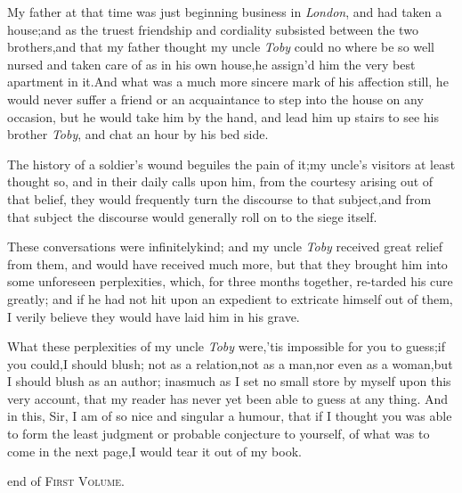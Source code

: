 \documentclass{article}
\begin{document}
My father at that time was just beginning business in
\textit{London}, and had taken a house;\tsk  and as the truest
friendship and cordiality subsisted between the two
brothers,\tsk  and that my father thought my uncle \textit{Toby} could no where be so well nursed
and taken care of as in his own house,\tsh  he
assign’d him the very best apartment in it.\tsk  And what
was a much more sincere mark of his affection still, he would never
suffer a friend or an acquaintance to step into the house on
any
occasion, but he would take him by the hand, and lead him up stairs
to see his brother \textit{Toby}, and chat an hour by his
bed side.

The history of a soldier’s wound beguiles the pain of
it;\tsk  my uncle’s visitors at least thought so, and in
their daily calls upon him, from the courtesy arising out of that
belief, they would frequently turn the discourse to that
subject,\tsk  and from that subject the discourse would generally
roll on to the siege itself.

These conversations were infinitely\break kind; and my uncle
\textit{Toby} received great relief from them, and would have
recei\-ved much more, but that they brought him into some unforeseen
perplexities, which, for three months together, re-\break tarded his
cure greatly; and if he had not hit upon an
expedient to extricate himself out of them, I verily believe they
would have laid him in his grave.

What these perplexities of my uncle \textit{Toby}
were,\tsh  ’tis impossible for you to guess;\tsk  if
you could,\tsk  I should blush; not as a relation,\tsk  not as a
man,\tsk  nor even as a woman,\tsk  but I should blush as an
author; inasmuch as I set no small store by myself upon this very
account, that my reader has never yet been able to guess at any
thing. And in this, Sir, I am of so nice and singular a humour,
that if I thought you was able to form the least judgment or
probable conjecture to yourself, of what was to come in the next
page,\tsk  I would tear it out of my book.

\bigskip
\centerline{ end of \textsc{First Volume}.}
\end{document}

